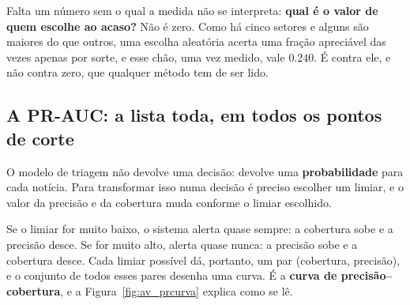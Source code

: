 Falta um número sem o qual a medida não se interpreta: \textbf{qual é o valor de quem escolhe ao
acaso?} Não é zero. Como há cinco setores e alguns são maiores do que outros, uma escolha aleatória
acerta uma fração apreciável das vezes apenas por sorte, e esse chão, uma vez medido, vale $0.240$.
É contra ele, e não contra zero, que qualquer método tem de ser lido.

\subsection{A PR-AUC: a lista toda, em todos os pontos de corte}
\label{sec:av_prauc}

O modelo de triagem não devolve uma decisão: devolve uma \textbf{probabilidade} para cada notícia.
Para transformar isso numa decisão é preciso escolher um limiar, e o valor da precisão e da cobertura
muda conforme o limiar escolhido.

Se o limiar for muito baixo, o sistema alerta quase sempre: a cobertura sobe e a precisão desce. Se
for muito alto, alerta quase nunca: a precisão sobe e a cobertura desce. Cada limiar possível dá,
portanto, um par (cobertura, precisão), e o conjunto de todos esses pares desenha uma curva. É a
\textbf{curva de precisão--cobertura}, e a Figura~\ref{fig:av_prcurva} explica como se lê.

